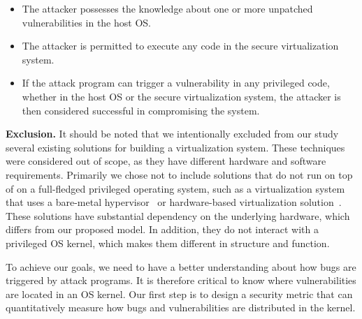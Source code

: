 \begin{itemize}\setlength\itemsep{0em}

\item The attacker possesses the knowledge about one or more unpatched vulnerabilities in the host OS.

\item The attacker is permitted to execute any code in the secure virtualization system.

\item If the attack program can trigger a vulnerability in any privileged code,
whether in the host OS or the secure virtualization system, the attacker is then considered successful 
in compromising the system.

\end{itemize}

\noindent
\textbf{Exclusion.}
It should be noted that we intentionally excluded from our study several existing
solutions for building a virtualization system. These techniques were considered
out of scope, as they have different hardware and software requirements.
Primarily we chose not to include solutions that do not run on top of on a full-fledged
privileged operating system, such as a virtualization system that uses a
bare-metal hypervisor~\cite{Xen-03} or hardware-based virtualization
solution~\cite{IntelVT}. 
These solutions have substantial dependency on the
underlying hardware, which differs from our proposed model. In addition,
they do not interact with a privileged OS kernel, which makes them different
in structure and function. 

To achieve our goals, we need to have a better understanding about how
bugs are triggered by attack programs. It is therefore critical to know where
vulnerabilities are located in an OS kernel. Our first step is to design
a security metric that can quantitatively measure how bugs and vulnerabilities
are distributed in the kernel.
